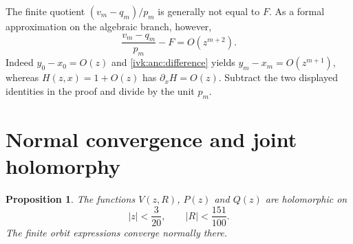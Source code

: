 \documentclass[11pt,letterpaper]{article}
\newtheorem{proposition}[theorem]{Proposition}
\theoremstyle{remark}\newtheorem{remark}[theorem]{Remark}
\begin{document}
The finite quotient $(v_m-q_m)/p_m$ is generally not equal to $F$.
As a formal approximation on the algebraic branch, however,
\begin{equation}\label{ivk:anc:finiteseries}
 \frac{v_m-q_m}{p_m}-F=O(z^{m+2}).
\end{equation}
Indeed $y_0-x_0=O(z)$ and \eqref{ivk:anc:difference} yields
$y_m-x_m=O(z^{m+1})$, whereas $H(z,x)=1+O(z)$ has
$\partial_xH=O(z)$. Subtract the two displayed identities in the
proof and divide by the unit $p_m$.

\section{Normal convergence and joint holomorphy}\label{ivk:anc:sec:normal}
\begin{proposition}\label{ivk:anc:prop:normal}
The functions $V(z,R)$, $P(z)$ and $Q(z)$ are holomorphic on
\begin{equation}\label{ivk:anc:bidomain}
 |z|<\frac3{20},\qquad |R|<\frac{151}{100}.
\end{equation}
The finite orbit expressions converge normally there.
\end{proposition}
\end{document}
